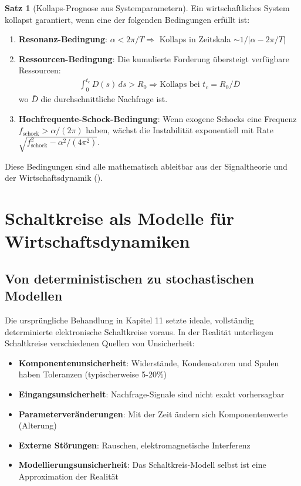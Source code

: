 \documentclass[a4paper,12pt,twoside]{report}
\theoremstyle{definition}
\newtheorem{satz}{Satz}
\begin{document}
\begin{satz}[Kollaps-Prognose aus Systemparametern]

Ein wirtschaftliches System kollapst garantiert, wenn eine der folgenden Bedingungen erfüllt ist:

\begin{enumerate}

\item \textbf{Resonanz-Bedingung}: $\alpha < 2\pi / T \Rightarrow$ Kollaps in Zeitskala $\sim 1/|\alpha - 2\pi/T|$

\item \textbf{Ressourcen-Bedingung}: Die kumulierte Forderung übersteigt verfügbare Ressourcen:
\begin{align}
\int_0^{t_c} D(s) \, ds > R_0 \Rightarrow \text{Kollaps bei } t_c = R_0 / \bar{D}
\end{align}
wo $\bar{D}$ die durchschnittliche Nachfrage ist.

\item \textbf{Hochfrequente-Schock-Bedingung}: Wenn exogene Schocks eine Frequenz $f_{\text{schock}} > \alpha/(2\pi)$ haben, wächst die Instabilität exponentiell mit Rate $\sqrt{f_{\text{schock}}^2 - \alpha^2/(4\pi^2)}$.

\end{enumerate}

Diese Bedingungen sind alle mathematisch ableitbar aus der Signaltheorie und der Wirtschaftsdynamik (\cite{epp_signal}).

\end{satz}

\section{Schaltkreise als Modelle für Wirtschaftsdynamiken}

\subsection{Von deterministischen zu stochastischen Modellen}

Die ursprüngliche Behandlung in Kapitel 11 setzte ideale, vollständig determinierte elektronische Schaltkreise voraus. In der Realität unterliegen Schaltkreise verschiedenen Quellen von Unsicherheit:

\begin{itemize}
    \item \textbf{Komponentenunsicherheit}: Widerstände, Kondensatoren und Spulen haben Toleranzen (typischerweise 5-20\%)
    \item \textbf{Eingangsunsicherheit}: Nachfrage-Signale sind nicht exakt vorhersagbar
    \item \textbf{Parameterveränderungen}: Mit der Zeit ändern sich Komponentenwerte (Alterung)
    \item \textbf{Externe Störungen}: Rauschen, elektromagnetische Interferenz
    \item \textbf{Modellierungsunsicherheit}: Das Schaltkreis-Modell selbst ist eine Approximation der Realität
\end{itemize}
\end{document}
